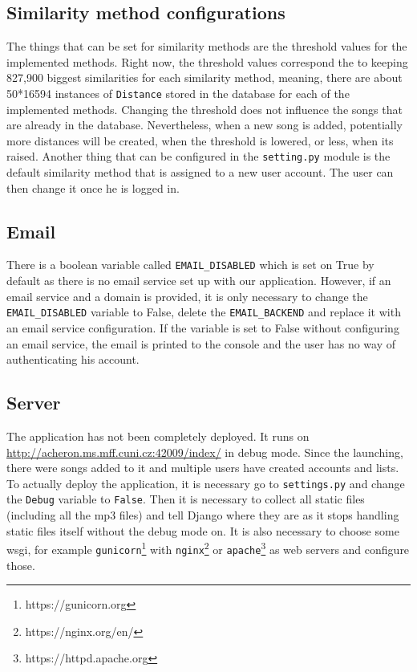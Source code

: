 \subsection{Similarity method configurations}
The things that can be set for similarity methods are the threshold values for the implemented methods. Right now, the threshold values correspond the to keeping 827,900 biggest similarities for each similarity method, meaning, there are about 50*16594 instances of \texttt{Distance} stored in the database for each of the implemented methods. Changing the threshold does not influence the songs that are already in the database. Nevertheless, when a new song is added, potentially more distances will be created, when the threshold is lowered, or less, when its raised. 
Another thing that can be configured in the \texttt{setting.py} module is the default similarity method that is assigned to a new user account. The user can then change it once he is logged in.

\subsection{Email}
There is a boolean variable called \texttt{EMAIL\_DISABLED} which is set on True by default as there is no email service set up with our application. However, if an email service and a domain is provided, it is only necessary to change the \texttt{EMAIL\_DISABLED} variable to False, delete the \texttt{EMAIL\_BACKEND} and replace it with an email service configuration. If the variable is set to False without configuring an email service, the email is printed to the console and the user has no way of authenticating his account.

\subsection{Server}

The application has not been completely deployed. It runs on \url{http://acheron.ms.mff.cuni.cz:42009/index/} in debug mode. Since the launching, there were songs added to it and multiple users have created accounts and lists. To actually deploy the application, it is necessary go to \texttt{settings.py} and change the \texttt{Debug} variable to \texttt{False}. Then it is necessary to collect all static files (including all the mp3 files) and tell Django where they are as it stops handling static files itself without the debug mode on. It is also necessary to choose some wsgi, for example \texttt{gunicorn}\footnote{https://gunicorn.org} with \texttt{nginx}\footnote{https://nginx.org/en/} or \texttt{apache}\footnote{https://httpd.apache.org} as web servers and configure those. 





